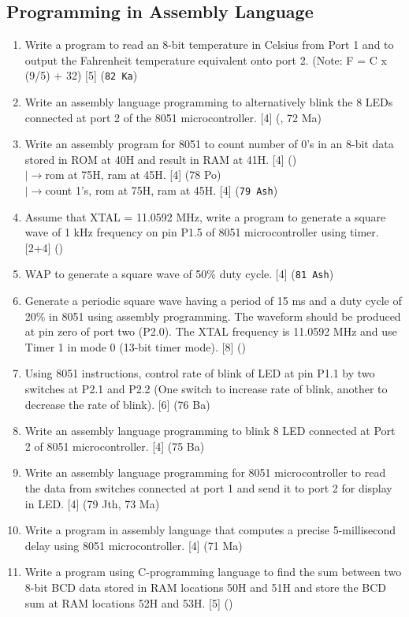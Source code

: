 \documentclass[12pt]{article}
\newcommand{\lb}{\\$\left|\rightarrow\right.$}
\begin{document}
  \subsection{Programming in Assembly Language}
    \begin{enumerate}
      \item Write a program to read an 8-bit temperature in Celsius from Port 1 and to output the Fahrenheit temperature equivalent onto port 2. (Note: F = C x (9/5) + 32) \hfill [5] (\texttt{82 Ka})

      \item Write an assembly language programming to alternatively blink the 8 LEDs connected at port 2 of the 8051 microcontroller. \hfill [4] (, 72 Ma)

      \item Write an assembly program for 8051 to count number of 0's in an 8-bit data stored in ROM at 40H and result in RAM at 41H. \hfill [4] ()
        \lb rom at 75H, ram at 45H. \hfill [4] (78 Po)
        \lb count 1's, rom at 75H, ram at 45H. \hfill [4] (\texttt{79 Ash})

      \item Assume that XTAL = 11.0592 MHz, write a program to generate a square wave of 1 kHz frequency on pin P1.5 of 8051 microcontroller using timer. \hfill [2+4] ()

      \item WAP to generate a square wave of 50\% duty cycle. \hfill [4] (\texttt{81 Ash})

      \item Generate a periodic square wave having a period of 15 ms and a duty cycle of 20\% in 8051 using assembly programming. The waveform should be produced at pin zero of port two (P2.0). The XTAL frequency is 11.0592 MHz and use Timer 1 in mode 0 (13-bit timer mode). \hfill [8] ()


      \item Using 8051 instructions, control rate of blink of LED at pin P1.1 by two switches at P2.1 and P2.2 (One switch to increase rate of blink, another to decrease the rate of blink). \hfill [6] (76 Ba)

      \item Write an assembly language programming to blink 8 LED connected at Port 2 of 8051 microcontroller. \hfill [4] (75 Ba)

      \item Write an assembly language programming for 8051 microcontroller to read the data from switches connected at port 1 and send it to port 2 for display in LED. \hfill [4] (79 Jth, 73 Ma)

      \item Write a program in assembly language that computes a precise 5-millisecond delay using 8051 microcontroller. \hfill [4] (71 Ma)

      \item Write a program using C-programming language to find the sum between two 8-bit BCD data stored in RAM locations 50H and 51H and store the BCD sum at RAM locations 52H and 53H. \hfill [5] ()
    \end{enumerate}
    
\end{document}
